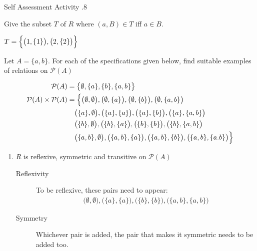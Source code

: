 \documentclass[\main/notes.tex]{subfiles}
\begin{document}
\begin{exercise}{Self Assessment Activity \thechapter.8}
\begin{questions}
\begin{questions}
\begin{answer}
									\end{answer}
								\item Give the subset $T$ of $R$ where $(a, B) \in T$ iff $a \in B$.\\
									\begin{answer}
										$T = \Bigl\{\bigl(1, \{1\}\bigr), \bigl(2, \{2\}\bigr)\Bigr\}$
									\end{answer}
							\end{questions}
						\item Let $A = \{a, b\}$. For each of the specifications given below, find suitable examples of relations on $\mathcal{P}(A)$
							\begin{answer}
								\begin{align*}
									\mathcal{P}(A) &= \bigl\{\emptyset, \{a\}, \{b\}, \{a, b\}\bigr\}\\
									\mathcal{P}(A) \times \mathcal{P}(A) &= \Bigl\{
										\bigl(\emptyset, \emptyset\bigr), \bigl(\emptyset, \{a\}\bigr), \bigl(\emptyset, \{b\}\bigr), \bigl(\emptyset, \{a, b\}\bigr)\\
										& \quad \bigl(\{a\}, \emptyset\bigr), \bigl(\{a\}, \{a\}\bigr), \bigl(\{a\}, \{b\}\bigr), \bigl(\{a\}, \{a, b\}\bigr)\\
										& \quad \bigl(\{b\}, \emptyset\bigr), \bigl(\{b\}, \{a\}\bigr), \bigl(\{b\}, \{b\}\bigr), \bigl(\{b\}, \{a, b\}\bigr)\\
										& \quad \bigl(\{a, b\}, \emptyset\bigr), \bigl(\{a, b\}, \{a\}\bigr), \bigl(\{a, b\}, \{b\}\bigr), \bigl(\{a, b\}, \{a. b\}\bigr)
									\Bigr\}
								\end{align*}
							\end{answer}
							\begin{enumerate}
								\item $R$ is reflexive, symmetric and transitive on $\mathcal{P}(A)$
									\begin{answer}
										\begin{description}
											\item[Reflexivity] To be reflexive, these pairs need to appear:
												\begin{align*}
													\bigl(\emptyset, \emptyset\bigr), \bigl(\{a\}, \{a\}\bigr), \bigl(\{b\}, \{b\}\bigr), \bigl(\{a, b\}, \{a, b\}\bigr)
												\end{align*}
											\item[Symmetry] Whichever pair is added, the pair that makes it symmetric needs to be added too.
												\begin{indentparagraph}

\end{indentparagraph}
\end{description}
\end{answer}
\end{enumerate}
\end{questions}
\end{exercise}
\end{document}
